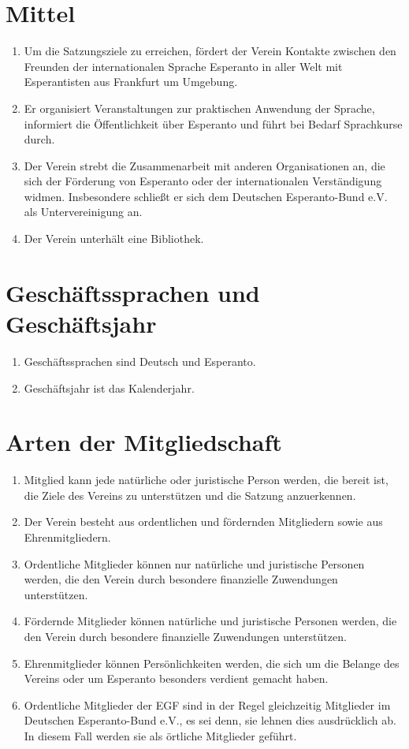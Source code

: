 \documentclass[11pt]{article}
\begin{document}
\section{Mittel}
\begin{enumerate}[label=\arabic*)]
	\item Um die Satzungsziele zu erreichen, fördert der Verein Kontakte zwischen den Freunden der internationalen Sprache Esperanto in aller Welt mit Esperantisten aus Frankfurt um Umgebung.
	\item Er organisiert Veranstaltungen zur praktischen Anwendung der Sprache, informiert die Öffentlichkeit über Esperanto und führt bei Bedarf Sprachkurse durch.
	\item Der Verein strebt die Zusammenarbeit mit anderen Organisationen an, die sich der Förderung von Esperanto oder der internationalen Verständigung widmen. Insbesondere schließt er sich dem Deutschen Esperanto-Bund e.V. als Untervereinigung an.
	\item Der Verein unterhält eine Bibliothek.
\end{enumerate}

\section{Geschäftssprachen und Geschäftsjahr}
\begin{enumerate}[label=\arabic*)]
	\item Geschäftssprachen sind Deutsch und Esperanto.
 \item Geschäftsjahr ist das Kalenderjahr.
\end{enumerate}

\section{Arten der Mitgliedschaft}
\begin{enumerate}[label=\arabic*)]
	\item Mitglied kann jede natürliche oder juristische Person werden, die bereit ist, die Ziele des Vereins zu unterstützen und die Satzung anzuerkennen.
	\item Der Verein besteht aus ordentlichen und fördernden Mitgliedern sowie aus Ehrenmitgliedern.
	\item Ordentliche Mitglieder können nur natürliche und juristische Personen werden, die den Verein durch besondere finanzielle Zuwendungen unterstützen.
	\item Fördernde Mitglieder können natürliche und juristische Personen werden, die den Verein durch besondere finanzielle Zuwendungen unterstützen.
	\item Ehrenmitglieder können Persönlichkeiten werden, die sich um die Belange des Vereins oder um Esperanto besonders verdient gemacht haben.
	\item Ordentliche Mitglieder der EGF sind in der Regel gleichzeitig Mitglieder im Deutschen Esperanto-Bund e.V., es sei denn, sie lehnen dies ausdrücklich ab. In diesem Fall werden sie als örtliche Mitglieder geführt.
\end{enumerate}
\end{document}
